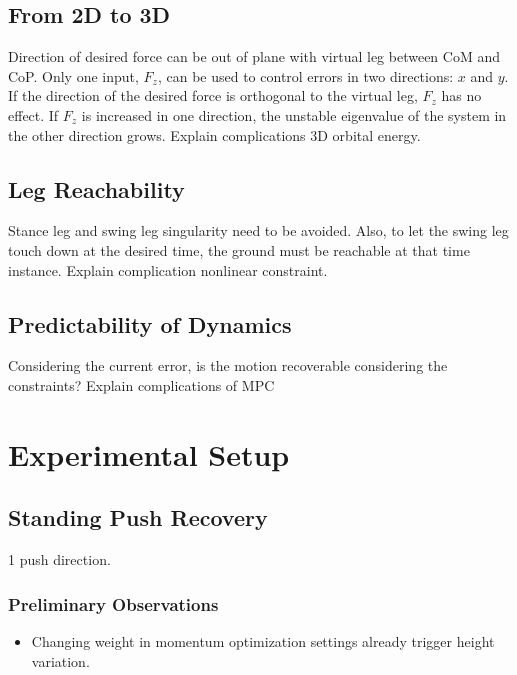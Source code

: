 \subsection{From 2D to 3D}
Direction of desired force can be out of plane with virtual leg between \ac{CoM} and \ac{CoP}. Only one input, $F_z$, can be used to control errors in two directions: $x$ and $y$. If the direction of the desired force is orthogonal to the virtual leg, $F_z$ has no effect. If $F_z$ is increased in one direction, the unstable eigenvalue of the system in the other direction grows. Explain complications 3D orbital energy. 
\subsection{Leg Reachability}
Stance leg and swing leg singularity need to be avoided. Also, to let the swing leg touch down at the desired time, the ground must be reachable at that time instance. Explain complication nonlinear constraint.
\subsection{Predictability of Dynamics}
Considering the current error, is the motion recoverable considering the constraints? Explain complications of \ac{MPC}

\section{Experimental Setup}

\subsection{Standing Push Recovery}
1 push direction.\\
\subsubsection{Preliminary Observations}
\begin{itemize}
	\item Changing weight in momentum optimization settings already trigger height variation.
\end{itemize}

